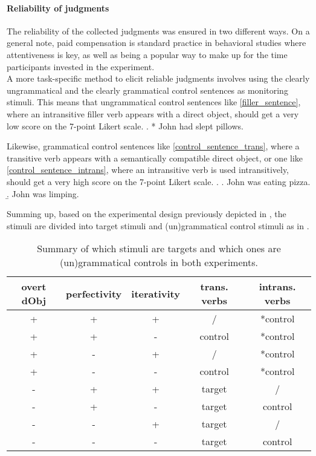 \paragraph{Reliability of judgments} The reliability of the collected judgments was ensured in two different ways. On a general note, paid compensation is standard practice in behavioral studies where attentiveness is key, as well as being a popular way to make up for the time participants invested in the experiment.\\
A more task-specific method to elicit reliable judgments involves using the clearly ungrammatical and the clearly grammatical control sentences as monitoring stimuli. This means that ungrammatical control sentences like \ref{filler_sentence}, where an intransitive filler verb appears with a direct object, should get a very low score on the 7-point Likert scale.
\ex. \label{filler_sentence} * John had slept pillows.

Likewise, grammatical control sentences like \ref{control_sentence_trans}, where a transitive verb appears with a semantically compatible direct object, or one like \ref{control_sentence_intrans}, where an intransitive verb is used intransitively, should get a very high score on the 7-point Likert scale.
\ex. \a. \label{control_sentence_trans} John was eating pizza.
\b. \label{control_sentence_intrans} John was limping.

Summing up, based on the experimental design previously depicted in , the stimuli are divided into target stimuli and (un)grammatical control stimuli as in .

\begin{table}[htb] %
\caption{Summary of which stimuli are targets and which ones are (un)grammatical controls in both experiments.}
\begin{tabular}{ccc|cc}
overt dObj & perfectivity & iterativity & trans. verbs & intrans. verbs \\
\hline
+          & +            & + & / & *control           \\
+          & +            & - & control & *control         \\
+          & -            & + & / & *control           \\
+          & -            & - & control & *control        \\
\hline
-          & +            & + & target & /          \\
-          & +            & - & target & control          \\
-          & -            & + & target & /          \\
-          & -            & - & target & control          
\end{tabular}
\end{table}

